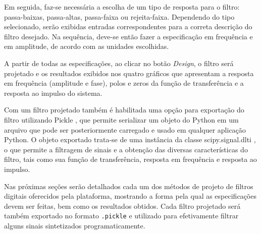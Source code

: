 \documentclass[12pt,a4paper]{report}
\begin{document}
  Em seguida, faz-se necessária a escolha de um tipo de resposta para o filtro: passa-baixas, passa-altas,
  passa-faixa ou rejeita-faixa. Dependendo do tipo selecionado, serão exibidas entradas correspondentes para a
  correta descrição do filtro desejado. Na sequência, deve-se então fazer a especificação em frequência e em
  amplitude, de acordo com as unidades escolhidas.

  A partir de todas as especificações, ao clicar no botão \textit{Design}, o filtro será projetado e os
  resultados exibidos nos quatro gráficos que apresentam a resposta em frequência (amplitude e fase), polos e
  zeros da função de transferência e a resposta ao impulso do sistema.

  Com um filtro projetado também é habilitada uma opção para exportação do filtro utilizando Pickle
  \cite{pickle}, que permite serializar um objeto do Python em um arquivo que pode ser posteriormente carregado
  e usado em qualquer aplicação Python. O objeto exportado trata-se de uma instância da classe scipy.signal.dlti
  \cite{scipy}, o que permite a filtragem de sinais e a obtenção das diversas características do filtro, tais
  como sua função de transferência, resposta em frequência e resposta ao impulso.

  Nas próximas seções serão detalhados cada um dos métodos de projeto de filtros digitais oferecidos pela
  plataforma, mostrando a forma pela qual as especificações devem ser feitas, bem como os resultados obtidos.
  Cada filtro projetado será também exportado no formato \texttt{.pickle} e utilizado para efetivamente filtrar
  alguns sinais sintetizados programaticamente.
\end{document}
